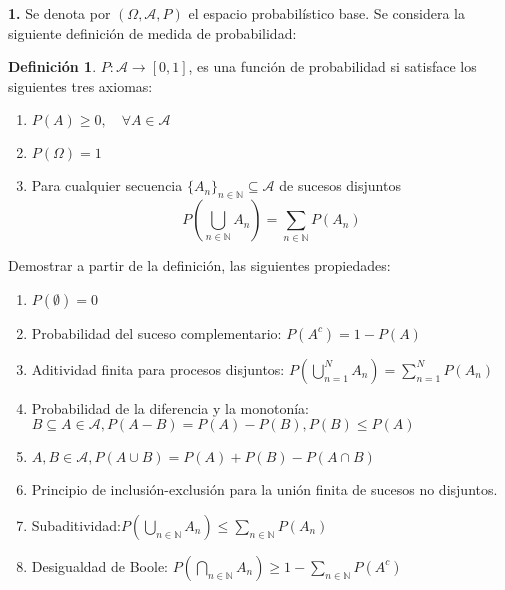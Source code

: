 \documentclass[a4paper, 12pt]{article}
\theoremstyle{plain}
\theoremstyle{definition}
\newtheorem{definicion}[teorema]{Definición}
\theoremstyle{remark}
\begin{document}
	\begin{flushleft}
		\textbf{1.} Se denota por $(\Omega,\mathcal{A},P)$ el espacio probabilístico base. Se considera la siguiente definición de medida de probabilidad:
		\begin{definicion}
			$P:\mathcal{A}\rightarrow[0,1]$, es una función de probabilidad si satisface los siguientes tres axiomas:
			\begin{enumerate}
				\item\label{1} $P(A)\geq 0, \quad \forall A \in \mathcal{A}$
				\item\label{2} $P(\Omega)=1$
				\item\label{3} Para cualquier secuencia $\{A_n\}_{n\in \mathbb{N}}\subseteq \mathcal{A}$ de sucesos disjuntos
				\[P\left(\bigcup_{n\in \mathbb{N}}A_n\right)=\sum_{n\in \mathbb{N}}P(A_n)\]
			\end{enumerate}
		\end{definicion}
		Demostrar a partir de la definición, las siguientes propiedades:
		\renewcommand{\theenumi}{\alph{enumi}}
		\begin{enumerate}
			\item\label{a} $P(\emptyset) = 0$
			\item\label{b} Probabilidad del suceso complementario: $P(A^c)=1-P(A)$
			\item\label{c} Aditividad finita para procesos disjuntos: $P(\bigcup_{n=1}^{N}A_n)=\sum_{n=1}^{N}P(A_n)$
			\item\label{d} Probabilidad de la diferencia y la monotonía: $B\subseteq A\in \mathcal{A}, P(A-B)=P(A)-P(B), P(B)\leq P(A)$
			\item\label{e} $A,B \in \mathcal{A}, P(A\cup B)=P(A)+P(B)-P(A\cap B)$
			\item\label{f} Principio de inclusión-exclusión para la unión finita de sucesos no disjuntos.
			\item\label{g} Subaditividad:$P(\bigcup_{n\in \mathbb{N}}A_n)\leq\sum_{n\in \mathbb{N}}P(A_n)$
			\item\label{h} Desigualdad de Boole: $P(\bigcap_{n\in \mathbb{N}}A_n)\geq 1-\sum_{n\in \mathbb{N}}P(A^c)$
		\end{enumerate}
	\end{flushleft}
	\newpage
\end{document}
